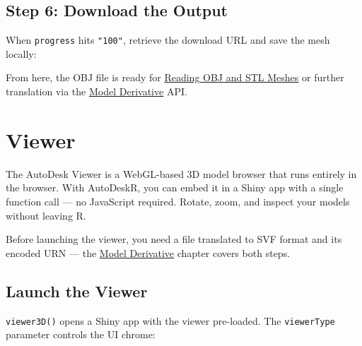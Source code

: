 \documentclass[
  11pt,
  letterpaper,
  DIV=11,
  numbers=noendperiod]{scrreprt}
\newenvironment{Shaded}{\begin{snugshade}}{\end{snugshade}}
\newcommand{\AttributeTok}[1]{\textcolor[rgb]{0.40,0.45,0.13}{#1}}
\newcommand{\FunctionTok}[1]{\textcolor[rgb]{0.28,0.35,0.67}{#1}}
\newcommand{\NormalTok}[1]{\textcolor[rgb]{0.00,0.23,0.31}{#1}}
\newcommand{\OtherTok}[1]{\textcolor[rgb]{0.00,0.23,0.31}{#1}}
\newcommand{\SpecialCharTok}[1]{\textcolor[rgb]{0.37,0.37,0.37}{#1}}
\newcommand{\StringTok}[1]{\textcolor[rgb]{0.13,0.47,0.30}{#1}}
\begin{document}
\section{Step 6: Download the Output}\label{step-6-download-the-output}

When \texttt{progress} hits \texttt{"100"}, retrieve the download URL
and save the mesh locally:

\begin{Shaded}
\end{Shaded}

From here, the OBJ file is ready for \href{mesh-reading.qmd}{Reading OBJ
and STL Meshes} or further translation via the
\hyperref[model-derivative]{Model Derivative} API.

\chapter{Viewer}\label{viewer}

The AutoDesk Viewer is a WebGL-based 3D model browser that runs entirely
in the browser. With AutoDeskR, you can embed it in a Shiny app with a
single function call --- no JavaScript required. Rotate, zoom, and
inspect your models without leaving R.

Before launching the viewer, you need a file translated to SVF format
and its encoded URN --- the \hyperref[model-derivative]{Model
Derivative} chapter covers both steps.

\section{Launch the Viewer}\label{launch-the-viewer}

\texttt{viewer3D()} opens a Shiny app with the viewer pre-loaded. The
\texttt{viewerType} parameter controls the UI chrome:
\end{document}

